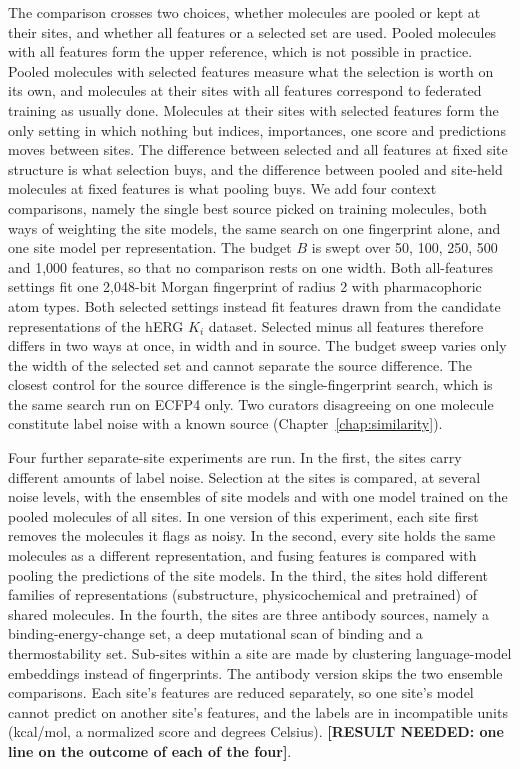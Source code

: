 The comparison crosses two choices, whether molecules are pooled or kept at their sites, and whether all features or a selected set are used. Pooled molecules with all features form the upper reference, which is not possible in practice. Pooled molecules with selected features measure what the selection is worth on its own, and molecules at their sites with all features correspond to federated training as usually done. Molecules at their sites with selected features form the only setting in which nothing but indices, importances, one score and predictions moves between sites. The difference between selected and all features at fixed site structure is what selection buys, and the difference between pooled and site-held molecules at fixed features is what pooling buys. We add four context comparisons, namely the single best source picked on training molecules, both ways of weighting the site models, the same search on one fingerprint alone, and one site model per representation. The budget $B$ is swept over 50, 100, 250, 500 and 1,000 features, so that no comparison rests on one width. Both all-features settings fit one 2,048-bit Morgan fingerprint of radius 2 with pharmacophoric atom types. Both selected settings instead fit features drawn from the candidate representations of the hERG $K_i$ dataset. Selected minus all features therefore differs in two ways at once, in width and in source. The budget sweep varies only the width of the selected set and cannot separate the source difference. The closest control for the source difference is the single-fingerprint search, which is the same search run on ECFP4 only. Two curators disagreeing on one molecule constitute label noise with a known source (Chapter~\ref{chap:similarity}).

Four further separate-site experiments are run. In the first, the sites carry different amounts of label noise. Selection at the sites is compared, at several noise levels, with the ensembles of site models and with one model trained on the pooled molecules of all sites. In one version of this experiment, each site first removes the molecules it flags as noisy. In the second, every site holds the same molecules as a different representation, and fusing features is compared with pooling the predictions of the site models. In the third, the sites hold different families of representations (substructure, physicochemical and pretrained) of shared molecules. In the fourth, the sites are three antibody sources, namely a binding-energy-change set, a deep mutational scan of binding and a thermostability set. Sub-sites within a site are made by clustering language-model embeddings instead of fingerprints. The antibody version skips the two ensemble comparisons. Each site's features are reduced separately, so one site's model cannot predict on another site's features, and the labels are in incompatible units (kcal/mol, a normalized score and degrees Celsius). \textbf{[RESULT NEEDED: one line on the outcome of each of the four]}.

